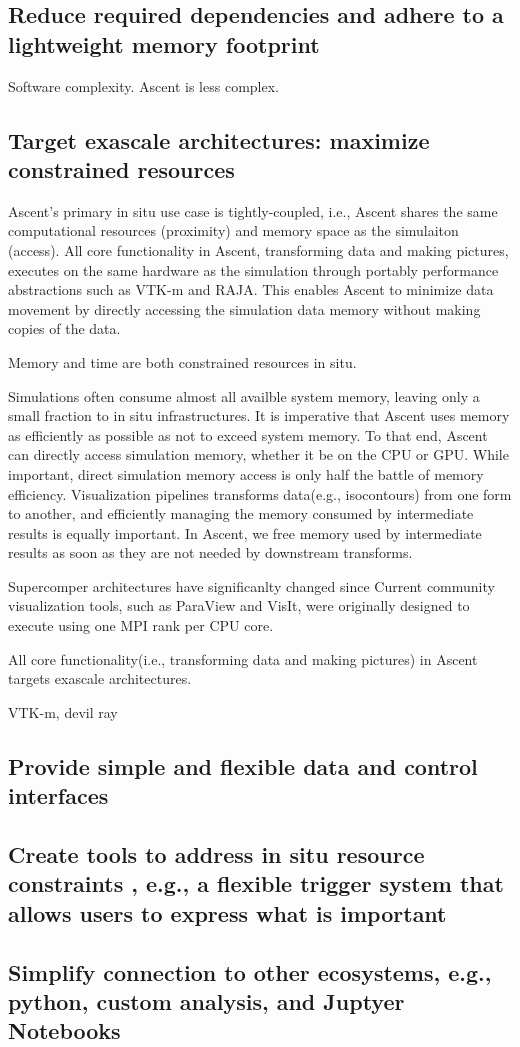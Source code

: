 
\subsection{Reduce required dependencies and adhere to a lightweight memory footprint}
Software complexity. Ascent is less complex.

\subsection{Target exascale architectures: maximize constrained resources}
Ascent's primary in situ use case is tightly-coupled, i.e.,
Ascent shares the same computational resources (proximity) and
memory space as the simulaiton (access).
%
All core functionality in Ascent, transforming data
and making pictures, executes on the same hardware as the
simulation through portably performance abstractions such as
VTK-m and RAJA.
%
This enables Ascent to minimize data movement by directly accessing
the simulation data memory without making copies of the data.
%

Memory and time are both constrained resources in situ.

%
Simulations often consume almost all availble system memory,
leaving only a small fraction to in situ infrastructures.
%
It is imperative that Ascent uses memory as efficiently as possible
as not to exceed system memory.
%
To that end, Ascent can directly access simulation memory, whether it be
on the CPU or GPU.
%
While important, direct simulation memory access is only half
the battle of memory efficiency.
%
Visualization pipelines transforms data(e.g., isocontours) from
one form to another, and efficiently managing the memory consumed
by intermediate results is equally important.
%
%
In Ascent, we free memory used by intermediate results as soon
as they are not needed by downstream transforms.
%


%
Supercomper architectures have significanlty changed since
%
Current community visualization tools, such as ParaView and VisIt, were originally
designed to execute using one MPI rank per CPU core.
%

All core functionality(i.e., transforming data and making pictures) in
Ascent targets exascale architectures.

VTK-m, devil ray

\subsection{Provide simple and flexible data and control interfaces}

\subsection{Create tools to address in situ resource constraints , e.g., a flexible trigger system that allows users to express what is important}

\subsection{Simplify connection to other ecosystems, e.g., python, custom analysis, and Juptyer Notebooks}
